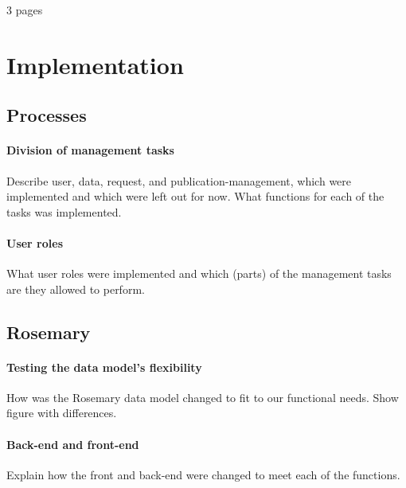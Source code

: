 \newline

3 pages

\section{Implementation}

\subsection{Processes}
\paragraph{Division of management tasks}
Describe user, data, request, and publication-management, which were implemented and which were left out for now.
What functions for each of the tasks was implemented.
\paragraph{User roles}
What user roles were implemented and which (parts) of the management tasks are they allowed to perform.

\subsection{Rosemary}
\paragraph{Testing the data model's flexibility}
How was the Rosemary data model changed to fit to our functional needs.
Show figure with differences.
\paragraph{Back-end and front-end}
Explain how the front and back-end were changed to meet each of the functions.